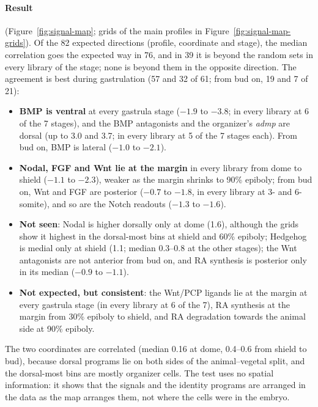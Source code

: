 \documentclass[11pt,a4paper]{article}
\begin{document}
\paragraph{Result} (Figure~\ref{fig:signal-map}; grids of the main profiles in Figure~\ref{fig:signal-map-grids}). Of the 82 expected directions (profile, coordinate and stage), the median correlation goes the expected way in 76, and in 39 it is beyond the random sets in every library of the stage; none is beyond them in the opposite direction. The agreement is best during gastrulation (57 and 32 of 61; from bud on, 19 and 7 of 21):
\begin{itemize}
	\item \textbf{BMP is ventral} at every gastrula stage ($-1.9$ to $-3.8$; in every library at 6 of the 7 stages), and the BMP antagonists and the organizer's \emph{admp} are dorsal (up to 3.0 and 3.7; in every library at 5 of the 7 stages each). From bud on, BMP is lateral ($-1.0$ to $-2.1$).
	\item \textbf{Nodal, FGF and Wnt lie at the margin} in every library from dome to shield ($-1.1$ to $-2.3$), weaker as the margin shrinks to 90\% epiboly; from bud on, Wnt and FGF are posterior ($-0.7$ to $-1.8$, in every library at 3- and 6-somite), and so are the Notch readouts ($-1.3$ to $-1.6$).
	\item \textbf{Not seen}: Nodal is higher dorsally only at dome (1.6), although the grids show it highest in the dorsal-most bins at shield and 60\% epiboly; Hedgehog is medial only at shield (1.1; median 0.3--0.8 at the other stages); the Wnt antagonists are not anterior from bud on, and RA synthesis is posterior only in its median ($-0.9$ to $-1.1$).
	\item \textbf{Not expected, but consistent}: the Wnt/PCP ligands lie at the margin at every gastrula stage (in every library at 6 of the 7), RA synthesis at the margin from 30\% epiboly to shield, and RA degradation towards the animal side at 90\% epiboly.
\end{itemize}
The two coordinates are correlated (median 0.16 at dome, 0.4--0.6 from shield to bud), because dorsal programs lie on both sides of the animal--vegetal split, and the dorsal-most bins are mostly organizer cells. The test uses no spatial information: it shows that the signals and the identity programs are arranged in the data as the map arranges them, not where the cells were in the embryo.
\end{document}
